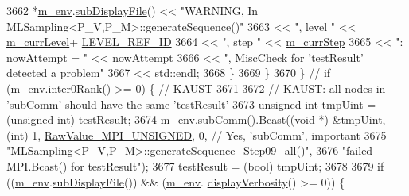 \begin{DoxyCode}
3662               *\hyperlink{class_q_u_e_s_o_1_1_m_l_sampling_a13f1ca4fe9f94822fe572a743eaced1d}{m\_env}.\hyperlink{class_q_u_e_s_o_1_1_base_environment_a8a0064746ae8dddfece4229b9ad374d6}{subDisplayFile}() << \textcolor{stringliteral}{"WARNING, In
       MLSampling<P\_V,P\_M>::generateSequence()"}
3663                                       << \textcolor{stringliteral}{", level "}        << \hyperlink{class_q_u_e_s_o_1_1_m_l_sampling_af9416874c856e50f3b35270e801f17e4}{m\_currLevel}+
      \hyperlink{_m_l_sampling_level_options_8h_a68d15eaf394d210effcf584b938206d3}{LEVEL\_REF\_ID}
3664                                       << \textcolor{stringliteral}{", step "}         << \hyperlink{class_q_u_e_s_o_1_1_m_l_sampling_a1b1f8ccb4823bdfa26ec652f0807c63e}{m\_currStep}
3665                                       << \textcolor{stringliteral}{": nowAttempt = "} << nowAttempt
3666                                       << \textcolor{stringliteral}{", MiscCheck for 'testResult' detected a problem"}
3667                                       << std::endl;
3668             \}
3669     \}
3670         \} \textcolor{comment}{// if (m\_env.inter0Rank() >= 0) \{ // KAUST}
3671 
3672         \textcolor{comment}{// KAUST: all nodes in 'subComm' should have the same 'testResult'}
3673         \textcolor{keywordtype}{unsigned} \textcolor{keywordtype}{int} tmpUint = (\textcolor{keywordtype}{unsigned} int) testResult;
3674         \hyperlink{class_q_u_e_s_o_1_1_m_l_sampling_a13f1ca4fe9f94822fe572a743eaced1d}{m\_env}.\hyperlink{class_q_u_e_s_o_1_1_base_environment_affe39f53e3d5d678842413370af09145}{subComm}().\hyperlink{class_q_u_e_s_o_1_1_mpi_comm_abd6af8db8b0c7fd2f5b62e26477a9537}{Bcast}((\textcolor{keywordtype}{void} *) &tmpUint, (\textcolor{keywordtype}{int}) 1, 
      \hyperlink{_mpi_comm_8h_a06cbfbc33436f6e0dc8a48ff3c49bdfc}{RawValue\_MPI\_UNSIGNED}, 0, \textcolor{comment}{// Yes, 'subComm', important}
3675                               \textcolor{stringliteral}{"MLSampling<P\_V,P\_M>::generateSequence\_Step09\_all()"},
3676                               \textcolor{stringliteral}{"failed MPI.Bcast() for testResult"});
3677         testResult = (bool) tmpUint;
3678 
3679         \textcolor{keywordflow}{if} ((\hyperlink{class_q_u_e_s_o_1_1_m_l_sampling_a13f1ca4fe9f94822fe572a743eaced1d}{m\_env}.\hyperlink{class_q_u_e_s_o_1_1_base_environment_a8a0064746ae8dddfece4229b9ad374d6}{subDisplayFile}()) && (\hyperlink{class_q_u_e_s_o_1_1_m_l_sampling_a13f1ca4fe9f94822fe572a743eaced1d}{m\_env}.
      \hyperlink{class_q_u_e_s_o_1_1_base_environment_a1fe5f244fc0316a0ab3e37463f108b96}{displayVerbosity}() >= 0)) \{

\end{DoxyCode}
